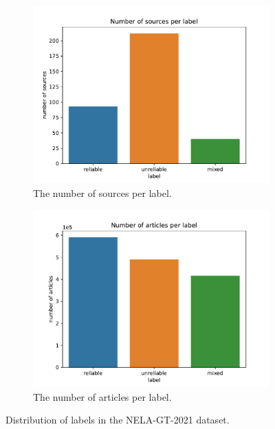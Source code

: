 \begin{figure}[H]
\centering
\begin{subfigure}{.5\textwidth}
  \centering
  \includegraphics[width=\linewidth]{obrazky-figures/labels_all_dist.pdf}
  \caption{The number of sources per label.}
  \label{fig:labels_all_dist}
\end{subfigure}%
\begin{subfigure}{.5\textwidth}
  \centering
  \includegraphics[width=\linewidth]{obrazky-figures/articles_per_label.pdf}
  \caption{The number of articles per label.}
  \label{fig:articles_per_label}
\end{subfigure}
\caption{Distribution of labels in the NELA-GT-2021 dataset.}
\label{fig:test}
\end{figure}


